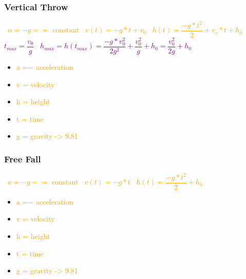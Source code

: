 \documentclass[main.tex,fontsize=8pt,paper=a4,paper=portrait,DIV=calc,]{scrartcl}
\begin{document}
\begin{multicols*}{2}
\subsubsection{Vertical Throw}
\, \newline
\large \textcolor{orange}{\( \alpha = -g == \text{ constant}  \)}\newline
\, \newline
\large \textcolor{orange}{\( v(t) = -g * t + v_0 \)}\newline
\, \newline
\large \textcolor{orange}{\( h(t) = \dfrac{-g * t^2}{2} + v_o * t + h_0  \)}\newline
\, \newline
\large \textcolor{purple}{\( t_{max} = \dfrac{v_0}{g} \)}\newline
\, \newline
\large \textcolor{purple}{\( h_{max} = h(t_{max}) = \dfrac{-g * v^{2}_{0}}{2 g^2 } + \dfrac{v_{0}^{2}}{g} + h_0 = \dfrac{v_{0}^{2}}{2g} + h_0 \)}\newline
\, \newline \normalsize
\begin{itemize}
\item \textcolor{orange}{a == acceleration}
\item \textcolor{orange}{v = velocity}
\item \textcolor{orange}{h = height}
\item \textcolor{orange}{t = time}
\item \textcolor{orange}{g = gravity -> 9.81}
\end{itemize} 

\subsubsection{Free Fall}
\, \newline
\large \textcolor{orange}{\( a = -g == \text{ constant} \)}\newline
\, \newline
\large \textcolor{orange}{\(v(t) = -g * t\)}\newline
\, \newline
\large \textcolor{orange}{\(h(t) = \dfrac{-g * t^2}{2} + h_0\)}\newline
\, \newline \normalsize
\begin{itemize}
\item \textcolor{orange}{a == acceleration}
\item \textcolor{orange}{v = velocity}
\item \textcolor{orange}{h = height}
\item \textcolor{orange}{t = time}
\item \textcolor{orange}{g = gravity -> 9.81}
\end{itemize} 


\end{multicols*}
\end{document}
